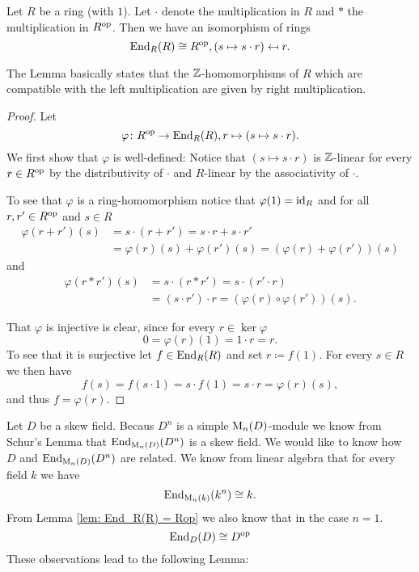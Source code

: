 \begin{lem}\label{lem: End_R(R) = Rop}
  Let $R$ be a ring (with $1$).
  Let $\cdot$ denote the multiplication in $R$ and $*$ the multiplication in $R^{\mathrm{op}}$.
  Then we have an isomorphism of rings
  \[
          \operatorname{End}_R(R)
    \cong R^{\mathrm{op}},
              (s \mapsto s \cdot r)
    \mapsfrom r.
  \]
\end{lem}


The Lemma basically states that the $\mathbb{Z}$-homomorphisms of $R$ which are compatible with the left multiplication are given by right multiplication.


\begin{proof}
  Let
  \[
            \varphi
    \colon  R^{\mathrm{op}}
    \to     \operatorname{End}_R(R),
            r
    \mapsto (s \mapsto s \cdot r).
  \]
  We first show that $\varphi$ is well-defined:
  Notice that $(s \mapsto s \cdot r)$ is $\mathbb{Z}$-linear for every $r \in R^{\mathrm{op}}$ by the distributivity of $\cdot$ and $R$-linear by the associativity of $\cdot$.
  
  To see that $\varphi$ is a ring-homomorphism notice that $\varphi(1) = \operatorname{id}_R$ and for all $r, r' \in R^{\mathrm{op}}$ and $s \in R$
  \begin{align*}
        \varphi(r+r')(s)
    &=  s \cdot (r + r')
     =  s \cdot r + s \cdot r' \\
    &=  \varphi(r)(s) + \varphi(r')(s)
     =  (\varphi(r)+\varphi(r'))(s)
  \end{align*}
  and
  \begin{align*}
        \varphi(r * r')(s)
    &=  s \cdot (r * r')
     =  s \cdot (r' \cdot r) \\
    &=  (s \cdot r') \cdot r
     =  \left(\varphi(r) \circ \varphi(r')\right)(s).
  \end{align*}
  
  That $\varphi$ is injective is clear, since for every $r \in \ker \varphi$
  \[
      0
    = \varphi(r)(1)
    = 1 \cdot r
    = r.
  \]
  To see that it is surjective let $f \in \operatorname{End}_R(R)$ and set $r \coloneqq f(1)$.
  For every $s \in R$ we then have
  \[
      f(s)
    = f(s \cdot 1)
    = s \cdot f(1)
    = s \cdot r
    = \varphi(r)(s),
  \]
  and thus $f = \varphi(r)$.
\end{proof}


Let $D$ be a skew field.
Becaus $D^n$ is a simple $\operatorname{M}_n(D)$-module we know from Schur’s Lemma that $\operatorname{End}_{\operatorname{M}_n(D)}(D^n)$ is a skew field.
We would like to know how $D$ and $\operatorname{End}_{\operatorname{M}_n(D)}(D^n)$ are related.
We know from linear algebra that for every field $k$ we have
\[
        \operatorname{End}_{\operatorname{M}_n(k)}(k^n)
  \cong k.
\]
From Lemma \ref{lem: End_R(R) = Rop} we also know that in the case $n = 1$. 
\[
  \operatorname{End}_D(D) \cong D^{\mathrm{op}}
\]
These observations lead to the following Lemma:


